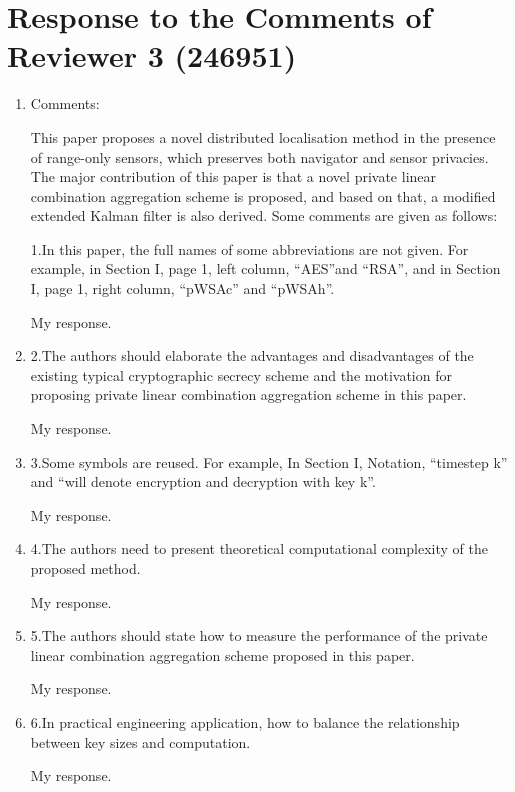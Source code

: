 \documentclass[a4paper]{scrartcl}
\newenvironment{rebuttal}{\begin{enumerate}[label={\color{grey}\thesection.\arabic{enumi}},leftmargin=0pt,ref=\thesection.\arabic{enumi}]}{\end{enumerate}}
\newcommand{\reviewtext}[1]{{\color{nblue} #1}}
\begin{document}



\section*{Response to the Comments of Reviewer 3 (246951)}
\def\thesection{R3}
\begin{rebuttal}
\item \reviewtext{Comments:

This paper proposes a novel distributed localisation method in the presence of range-only sensors, which preserves both navigator and sensor privacies. The major contribution of this paper is that a novel private linear combination aggregation scheme is proposed, and based on that, a modified extended Kalman filter is also derived. Some comments are given as follows:

1.In this paper, the full names of some abbreviations are not given. For example, in Section I, page 1, left column, “AES”and “RSA”, and in Section I, page 1, right column, “pWSAc” and “pWSAh”.}

My response.

\item \reviewtext{2.The authors should elaborate the advantages and disadvantages of the existing typical cryptographic secrecy scheme and the motivation for proposing private linear combination aggregation scheme in this paper.}

My response.

\item \reviewtext{3.Some symbols are reused. For example, In Section I, Notation, “timestep k” and “will denote encryption and decryption with key k”.}

My response.

\item \reviewtext{4.The authors need to present theoretical computational complexity of the proposed method.}

My response.

\item \reviewtext{5.The authors should state how to measure the performance of the private linear combination aggregation scheme proposed in this paper.}

My response.

\item \reviewtext{6.In practical engineering application, how to balance the relationship between key sizes and computation.}

My response.

\end{rebuttal}


\end{document}
